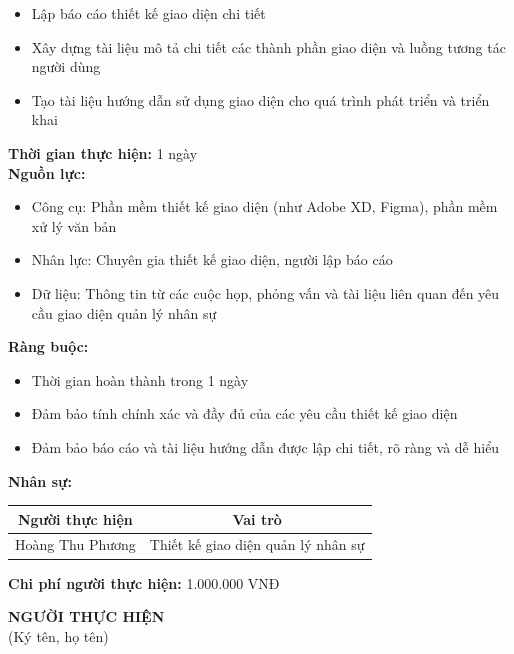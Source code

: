 {\begin{minipage}{\textwidth}
\begin{itemize}
        \item Lập báo cáo thiết kế giao diện chi tiết
        \item Xây dựng tài liệu mô tả chi tiết các thành phần giao diện và luồng tương tác người dùng
        \item Tạo tài liệu hướng dẫn sử dụng giao diện cho quá trình phát triển và triển khai
    \end{itemize}
    \vspace{0.5cm}
    \noindent \textbf{Thời gian thực hiện:} 1 ngày \\
    \noindent \textbf{Nguồn lực:}
    \begin{itemize}
        \item Công cụ: Phần mềm thiết kế giao diện (như Adobe XD, Figma), phần mềm xử lý văn bản
        \item Nhân lực: Chuyên gia thiết kế giao diện, người lập báo cáo
        \item Dữ liệu: Thông tin từ các cuộc họp, phỏng vấn và tài liệu liên quan đến yêu cầu giao diện quản lý nhân sự
    \end{itemize}
    \vspace{0.5cm}
    \noindent \textbf{Ràng buộc:}
    \begin{itemize}
        \item Thời gian hoàn thành trong 1 ngày
        \item Đảm bảo tính chính xác và đầy đủ của các yêu cầu thiết kế giao diện
        \item Đảm bảo báo cáo và tài liệu hướng dẫn được lập chi tiết, rõ ràng và dễ hiểu
    \end{itemize}
    \vspace{0.5cm}
    \noindent \textbf{Nhân sự:}
    \begin{longtable}{|c|c|}
    \hline
    \textbf{Người thực hiện} & \textbf{Vai trò} \\
    \hline
    Hoàng Thu Phương & Thiết kế giao diện quản lý nhân sự \\
    \hline
    \end{longtable}
    \vspace{0.5cm}
    \noindent \textbf{Chi phí người thực hiện:} 1.000.000 VNĐ
    \vspace{1cm}
    \begin{flushleft}
        \hspace{8cm} \textbf{NGƯỜI THỰC HIỆN} \\
        \hspace{8.8cm} (Ký tên, họ tên) \\
        \vspace{1cm}
    \end{flushleft}
    \end{minipage}
}
% 
